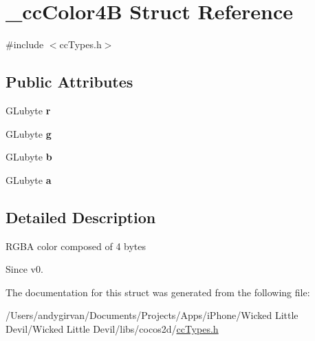 \hypertarget{struct__cc_color4_b}{\section{\-\_\-cc\-Color4\-B Struct Reference}
\label{struct__cc_color4_b}
}


{\ttfamily \#include $<$cc\-Types.\-h$>$}

\subsection*{Public Attributes}
\begin{DoxyCompactItemize}
\item 
\hypertarget{struct__cc_color4_b_ab1f567e15b6b3d83bd9f9b301895b66f}{G\-Lubyte {\bfseries r}}\label{struct__cc_color4_b_ab1f567e15b6b3d83bd9f9b301895b66f}

\item 
\hypertarget{struct__cc_color4_b_a3718941577c792feea5938dde5666d82}{G\-Lubyte {\bfseries g}}\label{struct__cc_color4_b_a3718941577c792feea5938dde5666d82}

\item 
\hypertarget{struct__cc_color4_b_abf402ebba867a4f3eaeeb9fc0fc7793c}{G\-Lubyte {\bfseries b}}\label{struct__cc_color4_b_abf402ebba867a4f3eaeeb9fc0fc7793c}

\item 
\hypertarget{struct__cc_color4_b_a651f023c5bf127ee102c5845d9e7f802}{G\-Lubyte {\bfseries a}}\label{struct__cc_color4_b_a651f023c5bf127ee102c5845d9e7f802}

\end{DoxyCompactItemize}


\subsection{Detailed Description}
\begin{DoxyVerb}RGBA color composed of 4 bytes
\end{DoxyVerb}
 \begin{DoxySince}{Since}
v0. 
\end{DoxySince}


The documentation for this struct was generated from the following file\-:\begin{DoxyCompactItemize}
\item 
/\-Users/andygirvan/\-Documents/\-Projects/\-Apps/i\-Phone/\-Wicked Little Devil/\-Wicked Little Devil/libs/cocos2d/\hyperlink{cc_types_8h}{cc\-Types.\-h}\end{DoxyCompactItemize}
